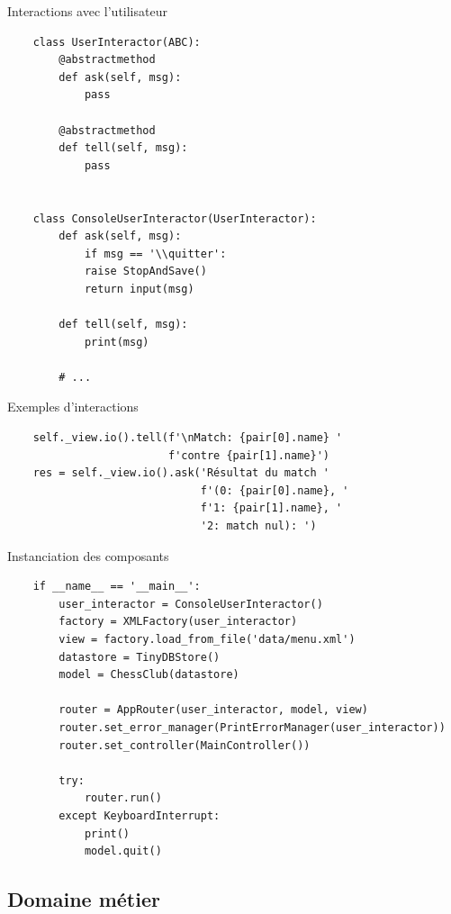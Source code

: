 \begin{frame}[fragile]{Interactions avec l'utilisateur}
  \footnotesize
  \begin{verbatim}
    class UserInteractor(ABC):
        @abstractmethod
        def ask(self, msg):
            pass

        @abstractmethod
        def tell(self, msg):
            pass
        
        
    class ConsoleUserInteractor(UserInteractor):
        def ask(self, msg):
            if msg == '\\quitter':
            raise StopAndSave()
            return input(msg)
        
        def tell(self, msg):
            print(msg)

        # ...
  \end{verbatim}
\end{frame}

\begin{frame}[fragile]{Exemples d'interactions}
  \begin{verbatim}
    self._view.io().tell(f'\nMatch: {pair[0].name} '
                         f'contre {pair[1].name}')
    res = self._view.io().ask('Résultat du match '
                              f'(0: {pair[0].name}, '
                              f'1: {pair[1].name}, '
                              '2: match nul): ')
  \end{verbatim}
\end{frame}

\begin{frame}[fragile]{Instanciation des composants}
  \footnotesize
  \begin{verbatim}
    if __name__ == '__main__':
        user_interactor = ConsoleUserInteractor()
        factory = XMLFactory(user_interactor)
        view = factory.load_from_file('data/menu.xml')
        datastore = TinyDBStore()
        model = ChessClub(datastore)
        
        router = AppRouter(user_interactor, model, view)
        router.set_error_manager(PrintErrorManager(user_interactor))
        router.set_controller(MainController())
        
        try:
            router.run()
        except KeyboardInterrupt:
            print()
            model.quit()
  \end{verbatim}
\end{frame}

\subsection{Domaine métier}

